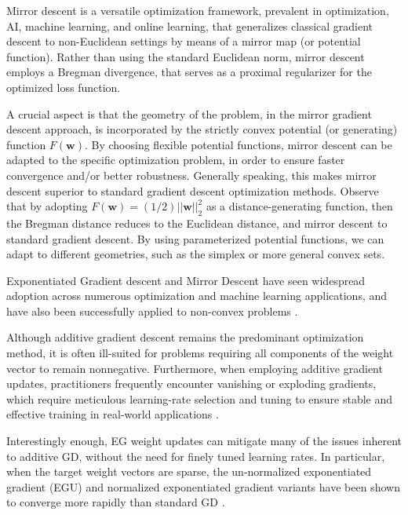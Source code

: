 \documentclass[10pt]{amsart}
\newcommand{\bw}{\boldsymbol{w}}
\theoremstyle{definition}
\theoremstyle{definition}	 %
\begin{document}
Mirror descent is a versatile optimization framework, prevalent in optimization, AI, machine learning, and online learning, that generalizes classical gradient descent to non-Euclidean settings by means of a mirror map (or potential function). Rather than using the standard Euclidean norm, mirror descent employs a Bregman divergence, that serves as a proximal regularizer for the optimized loss function.

A crucial aspect is that the geometry of the problem, in the mirror gradient descent approach, is incorporated by the strictly convex potential (or generating) function $F(\bw)$. By choosing flexible potential functions, mirror descent can be adapted to
the specific optimization problem,  in order to ensure faster convergence and/or better robustness. Generally speaking, this makes mirror descent superior to standard gradient descent optimization methods.
Observe that by adopting $F(\bw) =(1/2)||\bw||_2^2$ as a distance-generating function, then the Bregman distance reduces to the Euclidean distance, and mirror descent to standard gradient descent. By using parameterized potential functions,  we can adapt to  different geometries,  such as the simplex or more general convex sets.



Exponentiated Gradient  descent and Mirror Descent   have seen widespread adoption across numerous optimization and machine learning applications, and have also been successfully applied to non-convex problems \cite{Nemirowsky,Beck2003,MD1,MD2,EGSD,shalev2011}.



Although additive gradient descent remains the predominant optimization method, it is often ill-suited for problems requiring all components of the weight vector to remain nonnegative. Furthermore, when employing additive gradient updates, practitioners frequently encounter vanishing or exploding gradients, which require meticulous learning-rate selection and tuning to ensure stable and effective training in real-world applications \cite{Nemirowsky}.




Interestingly enough, EG weight updates can mitigate many of the issues inherent to additive GD, without the need for finely tuned learning rates. In particular, when the target weight vectors are sparse, the un-normalized exponentiated gradient (EGU) and normalized exponentiated gradient variants have been shown to converge more rapidly than standard GD \cite{EG,herbsterwarmuth,MD1}.
\end{document}
